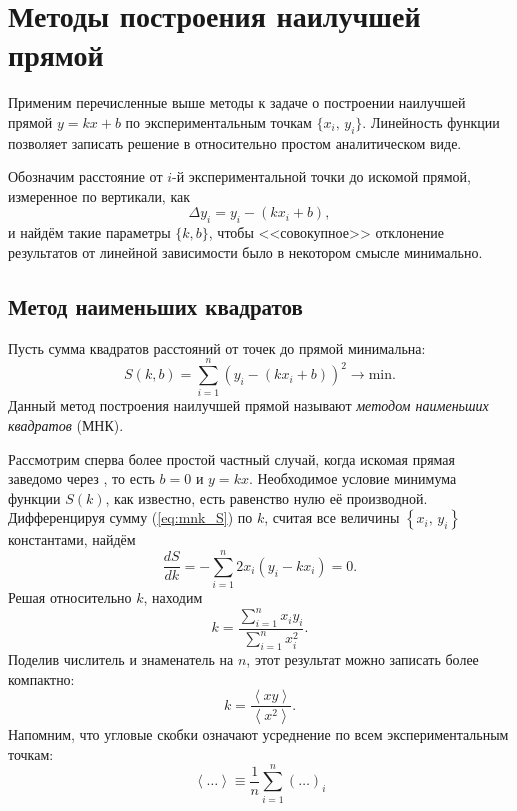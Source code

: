
\section{Методы построения наилучшей прямой}
Применим перечисленные выше методы к задаче о построении наилучшей прямой
$y=kx+b$ по экспериментальным точкам $\{x_i,\,y_i\}$.
Линейность функции позволяет записать решение в относительно
простом аналитическом виде.

Обозначим расстояние от $i$-й экспериментальной точки до искомой прямой,
измеренное по вертикали, как
\[
\Delta y_{i}=y_{i}-\left(kx_{i}+b\right),
\]
и найдём такие параметры $\{k,b\}$, чтобы <<совокупное>> отклонение
результатов от линейной зависимости было в некотором смысле минимально.

\subsection{Метод наименьших квадратов}\label{sec:MNK}
\label{sec:linear}
Пусть сумма квадратов расстояний от точек до прямой минимальна:
\begin{equation}\label{eq:mnk_S}
S\!\left(k,b\right)=
\sum\limits _{i=1}^{n}(y_i-(kx_i+b))^{2}\to\mathrm{min}.
\end{equation}
Данный метод построения наилучшей прямой называют \emph{методом наименьших
квадратов} (МНК).

Рассмотрим сперва более простой частный случай, когда искомая прямая
заведомо через , то есть $b=0$ и $y=kx$.
Необходимое условие минимума функции $S\left(k\right)$, как известно,
есть равенство нулю её производной. Дифференцируя сумму (\ref{eq:mnk_S})
по $k$, считая все величины $\left\{ x_{i},\,y_{i}\right\} $ константами,
найдём
\[
\frac{dS}{dk}=-\sum\limits _{i=1}^{n}2x_{i}\left(y_{i}-kx_{i}\right)=0.
\]
Решая относительно $k$, находим
\[
k=\frac{\sum\limits _{i=1}^{n}x_{i}y_{i}}{\sum\limits _{i=1}^{n}x_{i}^{2}}.
\]
Поделив числитель и знаменатель на $n$, этот результат можно записать
более компактно:
\begin{equation}
k=\frac{\left\langle xy\right\rangle }{\left\langle x^{2}\right\rangle}.
\label{eq:MNK0}
\end{equation}
Напомним, что угловые скобки означают усреднение по всем экспериментальным точкам:
\[
\left\langle \ldots\right\rangle \equiv\frac{1}{n}\sum\limits
_{i=1}^{n}\left(\ldots\right)_{i}
\]


